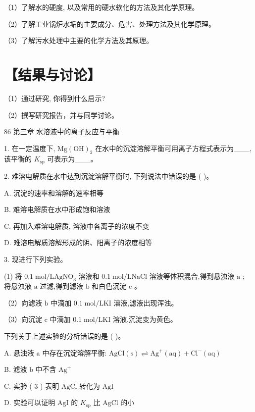 \documentclass[10pt]{article}
\begin{document}
（1）了解水的硬度, 以及常用的硬水软化的方法及其化学原理。

（2）了解工业锅炉水垢的主要成分、危害、处理方法及其化学原理。

（3）了解污水处理中主要的化学方法及其原理。

\section*{【结果与讨论】}

（1）通过研究, 你得到什么启示?

（2）撰写研究报告，并与同学讨论。

86 第三章 水溶液中的离子反应与平衡

1. 在一定温度下, \(\mathrm{{Mg}}{\left( \mathrm{{OH}}\right) }_{2}\) 在水中的沉淀溶解平衡可用离子方程式表示为\_\_\_, 该平衡的 \({K}_{\mathrm{{sp}}}\) 可表示为\_\_\_。

2. 难溶电解质在水中达到沉淀溶解平衡时, 下列说法中错误的是 ( )。

A. 沉淀的速率和溶解的速率相等

B. 难溶电解质在水中形成饱和溶液

C. 再加入难溶电解质, 溶液中各离子的浓度不变

D. 难溶电解质溶解形成的阴、阳离子的浓度相等

3. 现进行下列实验。

(1) 将 \({0.1}\mathrm{\;{mol}}/\mathrm{L}{\mathrm{{AgNO}}}_{3}\) 溶液和 \({0.1}\mathrm{\;{mol}}/\mathrm{L}\mathrm{{NaCl}}\) 溶液等体积混合,得到悬浊液 \(\mathrm{a}\) ; 将悬浊液 \(\mathrm{a}\) 过滤,得到滤液 \(\mathrm{b}\) 和白色沉淀 \(\mathrm{c}\) 。

（2）向滤液 \(\mathrm{b}\) 中滴加 \({0.1}\mathrm{\;{mol}}/\mathrm{L}\mathrm{{KI}}\) 溶液,滤液出现浑浊。

（3）向沉淀 \(\mathrm{c}\) 中滴加 \({0.1}\mathrm{\;{mol}}/\mathrm{L}\mathrm{{KI}}\) 溶液,沉淀变为黄色。

下列关于上述实验的分析错误的是 ( )。

A. 悬浊液 \(\mathrm{a}\) 中存在沉淀溶解平衡: \(\mathrm{{AgCl}}\left( \mathrm{s}\right) \rightleftharpoons {\mathrm{{Ag}}}^{ + }\left( \mathrm{{aq}}\right) + {\mathrm{{Cl}}}^{ - }\left( \mathrm{{aq}}\right)\)

B. 滤液 \(\mathrm{b}\) 中不含 \({\mathrm{{Ag}}}^{ + }\)

C. 实验 ( 3 ) 表明 \(\mathrm{{AgCl}}\) 转化为 \(\mathrm{{AgI}}\)

D. 实验可以证明 \(\mathrm{{AgI}}\) 的 \({K}_{\mathrm{{sp}}}\) 比 \(\mathrm{{AgCl}}\) 的小
\end{document}

